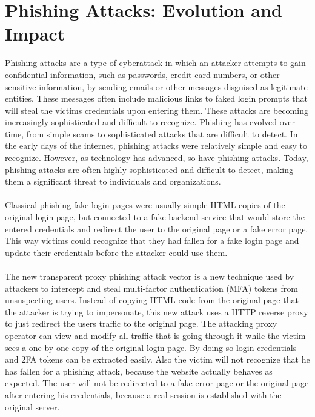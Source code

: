 \documentclass[12pt]{report}
\begin{document}
\section{Phishing Attacks: Evolution and Impact}
Phishing attacks are a type of cyberattack in which an attacker attempts to gain
confidential information, such as passwords, credit card numbers, or other
sensitive information, by sending emails or other messages disguised as legitimate
entities. These messages often include malicious links to faked login prompts
that will steal the victims credentials upon entering them. These attacks are becoming
increasingly sophisticated and difficult to recognize. Phishing has evolved
over time, from simple scams to sophisticated attacks that are difficult to detect.
In the early days of the internet, phishing attacks were relatively simple and
easy to recognize. However, as technology has advanced, so have phishing
attacks. Today, phishing attacks are often highly sophisticated and difficult
to detect, making them a significant threat to individuals and organizations.
\\ \\
Classical phishing fake login pages were usually simple HTML copies of the original
login page, but connected to a fake backend service that would store the entered credentials and
redirect the user to the original page or a fake error page. This way victims could recognize
that they had fallen for a fake login page and update their credentials before the attacker could
use them. \\ \\
The new transparent proxy phishing attack vector is a new technique used by attackers
to intercept and steal multi-factor authentication (MFA) tokens from unsuspecting
users. Instead of copying HTML code from the original page that the attacker is
trying to impersonate, this new attack uses a HTTP reverse proxy to just redirect
the users traffic to the original page. The attacking proxy operator can view and
modify all traffic that is going through it while the victim sees a one by one
copy of the original login page. By doing so login credentials and 2FA tokens
can be extracted easily. Also the victim will not recognize that he has fallen
for a phishing attack, because the website actually behaves as expected. The user
will not be redirected to a fake error page or the original page after entering
his credentials, because a real session is established with the original server. \\ \\
\end{document}
